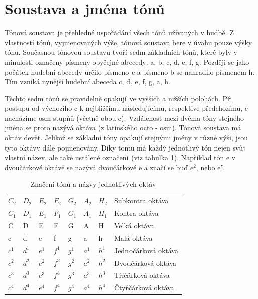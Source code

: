 \section{Soustava a jména tónů}
Tónová soustava je přehledné uspořádání všech tónů užívaných v hudbě.
Z vlastností tónů, vyjmenovaných výše, tónová soustava bere v úvahu pouze výšky tónu. 
Současnou tónovou soustavu tvoří sedm základních tónů, které
byly v minulosti označeny písmeny obyčejné abecedy: a, b, c, d, e, f, g.
Později se jako počátek hudební abecedy určilo písmeno c 
a písmeno b se nahradilo písmenem h.
Tím vzniká nynější hudební abeceda c, d, e, f, g, a, h.
\par

Těchto sedm tónů se pravidelně opakují ve vyšších a nižších polohách.
Při postupu od výchozího c k nejbližšímu následujícímu, respektive předchozímu, c nacházíme osm stupňů 
(včetně obou c).
Vzdálenost mezi dvěma tóny stejného jména se proto nazývá oktáva (z latinského octo - osm).
Tónová soustava má oktáv devět.
Jelikož se základní tóny opakují stejnými jmény v různé výši,
jsou tyto oktávy dále pojmenovány.
Díky tomu má každý jednotlivý tón nejen svůj vlastní název,
ale také ustálené označení (viz tabulka \ref{tabulkaOktav}).
Například tón e v dvoučárkové oktávě se nazývá dvoučárkové e
a značí se buď $e^2$, nebo{ e''}.
\cite{zenkl,cmiral}
\par

\begin{table}[]
    \begin{tabular}{ l l l l l l l | l }
        $C_2$ & $D_2$ & $E_2$ & $F_2$ & $G_2$ & $A_2$ & $H_2$ & Subkontra oktáva    \\
        $C_1$ & $D_1$ & $E_1$ & $F_1$ & $G_1$ & $A_1$ & $H_1$ & Kontra oktáva       \\
        C     & D     & E     & F     & G     & A     & H     & Velká oktáva        \\
        c     & d     & e     & f     & g     & a     & h     & Malá oktáva         \\
        $c^1$ & $d^1$ & $e^1$ & $f^1$ & $g^1$ & $a^1$ & $h^1$ & Jednočárková oktáva \\
        $c^2$ & $d^2$ & $e^2$ & $f^2$ & $g^2$ & $a^2$ & $h^2$ & Dvoučárková oktáva  \\
        $c^3$ & $d^3$ & $e^3$ & $f^3$ & $g^3$ & $a^3$ & $h^3$ & Tříčárková oktáva   \\
        $c^4$ & $d^4$ & $e^4$ & $f^4$ & $g^4$ & $a^4$ & $h^4$ & Čtyřčárková oktáva  \\
    \end{tabular}
    \caption{Značení tónů a názvy jednotlivých oktáv}
    \label{tabulkaOktav}
\end{table}

